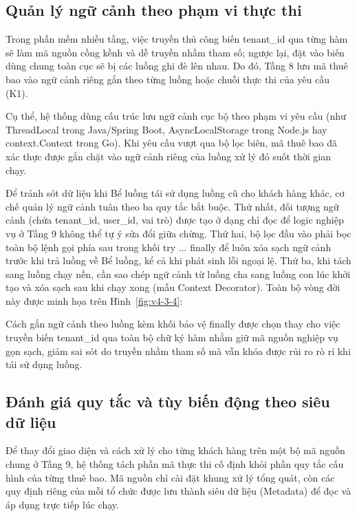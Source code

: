 \subsection{Quản lý ngữ cảnh theo phạm vi thực thi}\label{v4-sec-3-3-1}

Trong phần mềm nhiều tầng, việc truyền thủ công biến tenant\_\allowbreak{}id qua từng hàm sẽ làm mã nguồn cồng kềnh và dễ truyền nhầm tham số; ngược lại, đặt vào biến dùng chung toàn cục sẽ bị các luồng ghi đè lên nhau. Do đó, Tầng 8 lưu mã thuê bao vào ngữ cảnh riêng gắn theo từng luồng hoặc chuỗi thực thi của yêu cầu (K1).

Cụ thể, hệ thống dùng cấu trúc lưu ngữ cảnh cục bộ theo phạm vi yêu cầu (như ThreadLocal trong Java/Spring Boot, AsyncLocalStorage trong Node.js hay context.Context trong Go). Khi yêu cầu vượt qua bộ lọc biên, mã thuê bao đã xác thực được gắn chặt vào ngữ cảnh riêng của luồng xử lý đó suốt thời gian chạy.

Để tránh sót dữ liệu khi Bể luồng tái sử dụng luồng cũ cho khách hàng khác, cơ chế quản lý ngữ cảnh tuân theo ba quy tắc bắt buộc. Thứ nhất, đối tượng ngữ cảnh (chứa tenant\_\allowbreak{}id, user\_\allowbreak{}id, vai trò) được tạo ở dạng chỉ đọc để logic nghiệp vụ ở Tầng 9 không thể tự ý sửa đổi giữa chừng. Thứ hai, bộ lọc đầu vào phải bọc toàn bộ lệnh gọi phía sau trong khối try ... finally để luôn xóa sạch ngữ cảnh trước khi trả luồng về Bể luồng, kể cả khi phát sinh lỗi ngoại lệ. Thứ ba, khi tách sang luồng chạy nền, cần sao chép ngữ cảnh từ luồng cha sang luồng con lúc khởi tạo và xóa sạch sau khi chạy xong (mẫu Context Decorator). Toàn bộ vòng đời này được minh họa trên Hình~\ref{fig:v4-3-4}:


Cách gắn ngữ cảnh theo luồng kèm khối bảo vệ finally được chọn thay cho việc truyền biến tenant\_\allowbreak{}id qua toàn bộ chữ ký hàm nhằm giữ mã nguồn nghiệp vụ gọn sạch, giảm sai sót do truyền nhầm tham số mà vẫn khóa được rủi ro rò rỉ khi tái sử dụng luồng.

\subsection{Đánh giá quy tắc và tùy biến động theo siêu dữ liệu}\label{v4-sec-3-3-2}

Để thay đổi giao diện và cách xử lý cho từng khách hàng trên một bộ mã nguồn chung ở Tầng 9, hệ thống tách phần mã thực thi cố định khỏi phần quy tắc cấu hình của từng thuê bao. Mã nguồn chỉ cài đặt khung xử lý tổng quát, còn các quy định riêng của mỗi tổ chức được lưu thành siêu dữ liệu (Metadata) để đọc và áp dụng trực tiếp lúc chạy.

